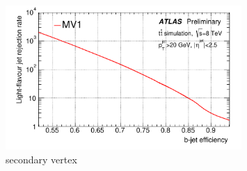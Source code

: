 \begin{figure}
	\includegraphics[width=0.8\textwidth]{ReconstructionPerformance/images/mv1_roc.pdf}
	\caption{secondary vertex	\label{fig:mv1_roc}  }
\end{figure}
















